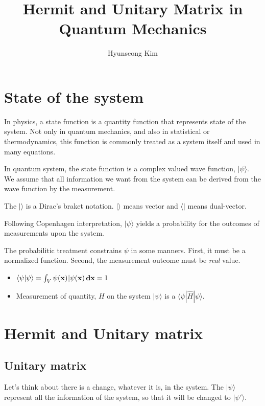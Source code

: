 \documentclass[10pt]{article}
\title{Hermit and Unitary Matrix in Quantum Mechanics}
\author{Hyunseong Kim}
\begin{document}
\maketitle
\newpage
\pagestyle{fancynotes}

\section{State of the system}

In physics, a state function is a quantity function that represents state of the system. 
Not only in quantum mechanics, and also in statistical or thermodynamics, 
this function is commonly treated as a system itself and used in many equations.

In quantum system, the state function is a complex valued wave function, $| \psi \rangle$.
We assume that all information we want from the system can be derived from the wave function by the measurement. 

The $| \rangle$ is a Dirac's braket notation. $| \rangle$ means vector and $\langle |$ means dual-vector.

Following Copenhagen interpretation, $| \psi \rangle$ yields a probability for the outcomes of measurements upon the system.

The probabilitic treatment constrains $\psi$ in some manners.
First, it must be a normalized function. 
Second, the measurement outcome must be \textit{real} value.

\begin{itemize}
    \item $\langle \psi| \psi\rangle = \int_{V} \psi(\mathbf{x})^{\*}| \psi(\mathbf{x}) \, \mathbf{dx} = 1$
    \item Measurement of quantity, $H$ on the system $| \psi \rangle$ is a $\langle \psi|\hat{H}| \psi\rangle $.
\end{itemize}

\section{Hermit and Unitary matrix}

\subsection{Unitary matrix}

Let's think about there is a change, whatever it is, in the system.
The $| \psi \rangle$ represent all the information of the system, so that it will be changed to $| \psi' \rangle$. 
\end{document}
